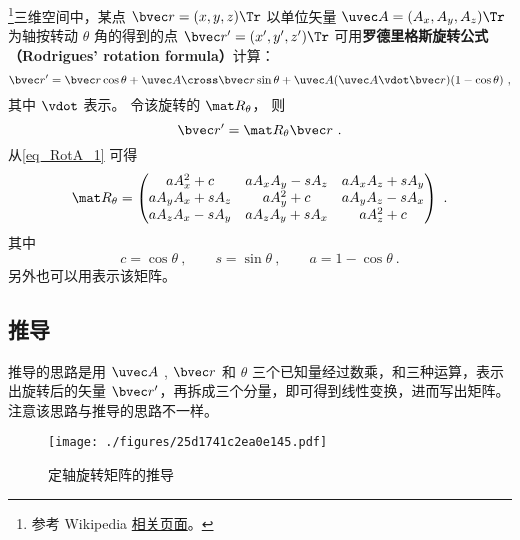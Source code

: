 

\footnote{参考 Wikipedia \href{https://en.wikipedia.org/wiki/Rodrigues'_rotation_formula}{相关页面}。}三维空间中，某点 $\bvec r=(x,y,z)\Tr$ 以单位矢量 $\uvec A=(A_x, A_y, A_z)\Tr$ 为轴按转动 $\theta$ 角的得到的点 $\bvec r'=(x',y',z')\Tr$ 可用\textbf{罗德里格斯旋转公式（Rodrigues' rotation formula）}计算：
\begin{equation}\label{eq_RotA_1}
\bvec r' = \bvec r \cos\theta + \uvec A \cross \bvec r \sin\theta + \uvec A (\uvec A \vdot \bvec r) (1 - \cos\theta)~,
\end{equation}
其中 $\vdot$ 表示。 令该旋转的 $\mat R_\theta$， 则
\begin{equation}\label{eq_RotA_2}
\bvec r' = \mat R_\theta \bvec r~.
\end{equation}
从\autoref{eq_RotA_1} 可得
\begin{equation}\label{eq_RotA_3}
\mat R_\theta =
\begin{pmatrix}
a A_x^2 + c & a A_x A_y - s A_z & a A_x A_z + s A_y\\
a A_y A_x + s A_z & a A_y^2 + c & a A_y A_z - s A_x\\
a A_z A_x - s A_y & a A_z A_y + s A_x & a A_z^2 + c
\end{pmatrix}~.\end{equation}
其中
\begin{equation}
c = \cos\theta ~,\qquad s = \sin\theta~, \qquad a = 1 - \cos\theta~.
\end{equation}
另外也可以用表示该矩阵。

\subsection{推导}
推导的思路是用 $\uvec A$ , $\bvec r$ 和 $\theta $ 三个已知量经过数乘，和三种运算，表示出旋转后的矢量 $\bvec r'$，再拆成三个分量，即可得到线性变换，进而写出矩阵。 注意该思路与推导的思路不一样。
\begin{figure}[ht]
\centering
\texttt{[image: ./figures/25d1741c2ea0e145.pdf]}
\caption{定轴旋转矩阵的推导} \label{fig_RotA_1}
\end{figure} 

